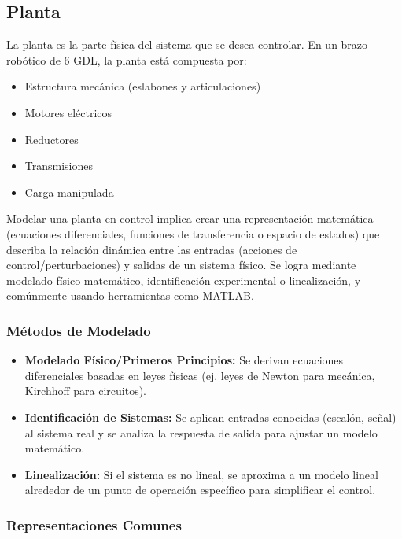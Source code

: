 \documentclass[11pt]{article}
\begin{document}
\subsection{Planta}

La planta es la parte física del sistema que se desea controlar. En un brazo robótico de 6 GDL, la planta está compuesta por:

\begin{itemize}
	\item Estructura mecánica (eslabones y articulaciones)
	\item Motores eléctricos
	\item Reductores
	\item Transmisiones
	\item Carga manipulada
\end{itemize}

Modelar una planta en control implica crear una representación matemática (ecuaciones diferenciales, funciones de transferencia o espacio de estados) que describa la relación dinámica entre las entradas (acciones de control/perturbaciones) y salidas de un sistema físico. Se logra mediante modelado físico-matemático, identificación experimental o linealización, y comúnmente usando herramientas como MATLAB.

\subsubsection{Métodos de Modelado}

\begin{itemize}
	\item \textbf{Modelado Físico/Primeros Principios:} Se derivan ecuaciones diferenciales basadas en leyes físicas (ej. leyes de Newton para mecánica, Kirchhoff para circuitos).
	\item \textbf{Identificación de Sistemas:} Se aplican entradas conocidas (escalón, señal) al sistema real y se analiza la respuesta de salida para ajustar un modelo matemático.
	\item \textbf{Linealización:} Si el sistema es no lineal, se aproxima a un modelo lineal alrededor de un punto de operación específico para simplificar el control.
\end{itemize}

\subsubsection{Representaciones Comunes}
\end{document}
